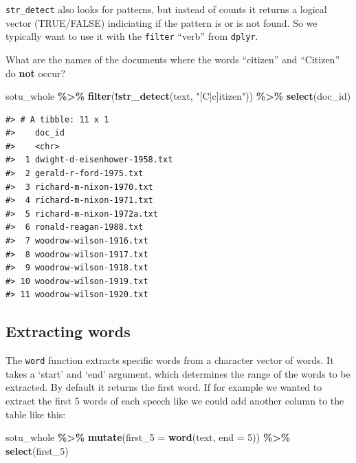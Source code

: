 \documentclass[
]{book}
\newenvironment{Shaded}{\begin{snugshade}}{\end{snugshade}}
\newcommand{\AttributeTok}[1]{\textcolor[rgb]{0.13,0.29,0.53}{#1}}
\newcommand{\DecValTok}[1]{\textcolor[rgb]{0.00,0.00,0.81}{#1}}
\newcommand{\FunctionTok}[1]{\textcolor[rgb]{0.13,0.29,0.53}{\textbf{#1}}}
\newcommand{\NormalTok}[1]{#1}
\newcommand{\SpecialCharTok}[1]{\textcolor[rgb]{0.81,0.36,0.00}{\textbf{#1}}}
\newcommand{\StringTok}[1]{\textcolor[rgb]{0.31,0.60,0.02}{#1}}
\begin{document}
\texttt{str\_detect} also looks for patterns, but instead of counts it returns a logical vector (TRUE/FALSE) indiciating if the pattern is or is not found. So we typically want to use it with the \texttt{filter} ``verb'' from \texttt{dplyr}.

What are the names of the documents where the words ``citizen'' and ``Citizen'' do \textbf{not} occur?

\begin{Shaded}
\begin{Highlighting}[]
\NormalTok{sotu\_whole }\SpecialCharTok{\%\textgreater{}\%} 
  \FunctionTok{filter}\NormalTok{(}\SpecialCharTok{!}\FunctionTok{str\_detect}\NormalTok{(text, }\StringTok{"[C|c]itizen"}\NormalTok{)) }\SpecialCharTok{\%\textgreater{}\%} 
  \FunctionTok{select}\NormalTok{(doc\_id) }
\end{Highlighting}
\end{Shaded}

\begin{verbatim}
#> # A tibble: 11 x 1
#>    doc_id                      
#>    <chr>                       
#>  1 dwight-d-eisenhower-1958.txt
#>  2 gerald-r-ford-1975.txt      
#>  3 richard-m-nixon-1970.txt    
#>  4 richard-m-nixon-1971.txt    
#>  5 richard-m-nixon-1972a.txt   
#>  6 ronald-reagan-1988.txt      
#>  7 woodrow-wilson-1916.txt     
#>  8 woodrow-wilson-1917.txt     
#>  9 woodrow-wilson-1918.txt     
#> 10 woodrow-wilson-1919.txt     
#> 11 woodrow-wilson-1920.txt
\end{verbatim}

\subsection{Extracting words}\label{extracting-words}

The \texttt{word} function extracts specific words from a character vector of words. It takes a `start' and `end' argument, which determines the range of the words to be extracted. By default it returns the first word. If for example we wanted to extract the first 5 words of each speech like we could add another column to the table like this:

\begin{Shaded}
\begin{Highlighting}[]
\NormalTok{sotu\_whole }\SpecialCharTok{\%\textgreater{}\%} 
  \FunctionTok{mutate}\NormalTok{(}\AttributeTok{first\_5 =} \FunctionTok{word}\NormalTok{(text, }\AttributeTok{end =} \DecValTok{5}\NormalTok{)) }\SpecialCharTok{\%\textgreater{}\%} 
  \FunctionTok{select}\NormalTok{(first\_5)}
\end{Highlighting}
\end{Shaded}
\end{document}
